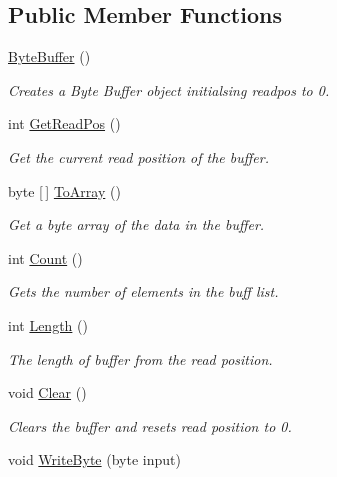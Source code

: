 \subsection*{Public Member Functions}
\begin{DoxyCompactItemize}
\item 
\mbox{\hyperlink{class_byte_buffer_aa1b95c150b581b8e0cf15b650e162f54}{Byte\+Buffer}} ()
\begin{DoxyCompactList}\small\item\em Creates a Byte Buffer object initialsing readpos to 0. \end{DoxyCompactList}\item 
int \mbox{\hyperlink{class_byte_buffer_ad73900a2c6d3ee2efcc6d07f66340497}{Get\+Read\+Pos}} ()
\begin{DoxyCompactList}\small\item\em Get the current read position of the buffer. \end{DoxyCompactList}\item 
byte \mbox{[}$\,$\mbox{]} \mbox{\hyperlink{class_byte_buffer_a52290714c9deb79ac6f7039aa566147c}{To\+Array}} ()
\begin{DoxyCompactList}\small\item\em Get a byte array of the data in the buffer. \end{DoxyCompactList}\item 
int \mbox{\hyperlink{class_byte_buffer_ab599e90a3d53e05e8e04e2388f444873}{Count}} ()
\begin{DoxyCompactList}\small\item\em Gets the number of elements in the buff list. \end{DoxyCompactList}\item 
int \mbox{\hyperlink{class_byte_buffer_a45c99a0058fc2d9d38b5829bf34f6317}{Length}} ()
\begin{DoxyCompactList}\small\item\em The length of buffer from the read position. \end{DoxyCompactList}\item 
void \mbox{\hyperlink{class_byte_buffer_a879ab4931f4225b40611c56c9d3781f0}{Clear}} ()
\begin{DoxyCompactList}\small\item\em Clears the buffer and resets read position to 0. \end{DoxyCompactList}\item 
void \mbox{\hyperlink{class_byte_buffer_a7650f89f25ac6d9770a502c294a4f6a8}{Write\+Byte}} (byte input)

\end{DoxyCompactItemize}
